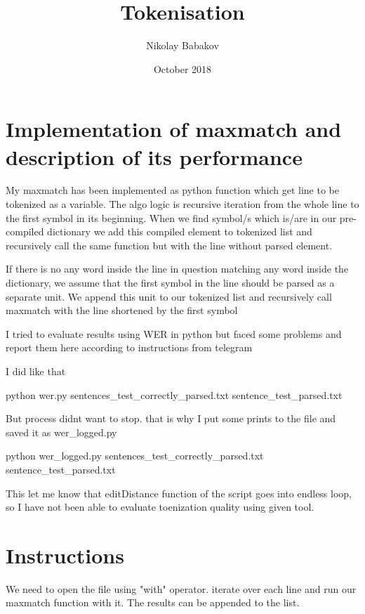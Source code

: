 \documentclass{article}
\title{Tokenisation}
\author{Nikolay Babakov }
\date{October 2018}
\begin{document}
\maketitle

\section{Implementation of maxmatch and description of its performance}
My maxmatch has been implemented as python function which get line to be tokenized as a variable. The algo logic is recursive iteration from the whole line to the first symbol in its beginning. When we find symbol/s which is/are in our pre-compiled dictionary we add this compiled element to tokenized list and recursively call the same function but with the line without parsed element. \newline

If there is no any word inside the line in question matching any word inside the dictionary, we assume that the first symbol in the line should be parsed as a separate unit. We append this unit to our tokenized list and recursively call maxmatch with the line shortened by the first symbol

I tried to evaluate results using WER in python but faced some problems and report them here according to instructions from telegram

I did like that

python wer.py sentences_test_correctly_parsed.txt sentence_test_parsed.txt

But process didnt want to stop. that is why I put some prints to the file and saved it as wer_logged.py

python wer_logged.py sentences_test_correctly_parsed.txt sentence_test_parsed.txt

This let me know that editDistance function of the script goes into endless loop, so I have not been able to evaluate toenization quality using given tool.

\section{Instructions }
We need to open the file using "with" operator. iterate over each line and run our maxmatch function with it. The results can be appended to the list.
\end{document}

